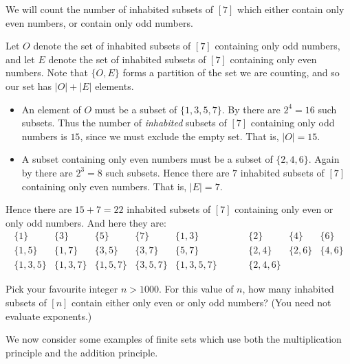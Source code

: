 \begin{example}
We will count the number of inhabited subsets of $[7]$ which either contain only even numbers, or contain only odd numbers.

Let $O$ denote the set of inhabited subsets of $[7]$ containing only odd numbers, and let $E$ denote the set of inhabited subsets of $[7]$ containing only even numbers. Note that $\{ O, E \}$ forms a partition of the set we are counting, and so our set has $|O|+|E|$ elements.
\begin{itemize}
\item An element of $O$ must be a subset of $\{1,3,5,7\}$. By  there are $2^4=16$ such subsets. Thus the number of \textit{inhabited} subsets of $[7]$ containing only odd numbers is $15$, since we must exclude the empty set. That is, $|O|=15$.
\item A subset containing only even numbers must be a subset of $\{2,4,6\}$. Again by  there are $2^3=8$ such subsets. Hence there are $7$ inhabited subsets of $[7]$ containing only even numbers. That is, $|E|=7$.
\end{itemize}
Hence there are $15+7=22$ inhabited subsets of $[7]$ containing only even or only odd numbers. And here they are:
\[ \begin{matrix}
\{ 1 \} & \{ 3 \} & \{ 5 \} & \{ 7 \} & \{ 1, 3 \} & \hspace{20pt} & \{ 2 \} & \{ 4 \} & \{ 6 \} \\
\{ 1, 5 \} & \{ 1, 7 \} & \{ 3, 5 \} & \{ 3, 7 \} & \{ 5, 7 \} && \{ 2, 4 \} & \{ 2, 6 \} & \{ 4, 6 \} \\
\{ 1, 3, 5 \} & \{ 1, 3, 7 \} & \{ 1, 5, 7 \} & \{ 3, 5, 7 \} & \{ 1, 3, 5, 7\} && \{ 2, 4, 6 \} && 
\end{matrix} \]
\end{example}

\begin{exercise}
Pick your favourite integer $n > 1000$. For this value of $n$, how many inhabited subsets of $[n]$ contain either only even or only odd numbers? (You need not evaluate exponents.)
\end{exercise}

We now consider some examples of finite sets which use both the multiplication principle and the addition principle.

